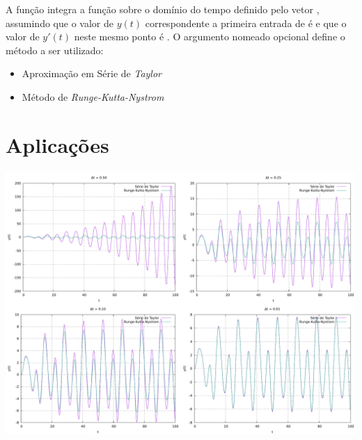 \documentclass{homework}
\begin{document}
	A função  integra a função  sobre o domínio do tempo definido pelo vetor , assumindo que o valor de $y(t)$ correspondente a primeira entrada de  é  e que o valor de $y'(t)$ neste mesmo ponto é . O argumento nomeado opcional  define o método a ser utilizado:
	\begin{itemize}[leftmargin=100pt]
		\item[\code{'taylor'}] Aproximação em Série de \textit{Taylor}
		\item[\code{'runge-kutta-nystrom'}] Método de \textit{Runge-Kutta-Nystrom}
	\end{itemize}
	
	
	
	\newpage
	
	\section*{Aplicações}
	
	\questx[{Resolva a seguinte equação diferencial pelos métodos 'Expansão em Série de \textit{Taylor}' e \textit{Runge-Kutta-Nystrom}, $0 \le t \le 100$, utilizando o programa desenvolvido na Tarefa 02:%
	\begin{align*}%
		&m y''(t) + c y'(t) + k y(t) = F(t)\\
		&m = 1; c = 0.2; k = 1;\\
		&F(t) = 2 \sin (w t) + \sin (2 w t) + cos (3 w t)\\
		&w = 0.5;\\
		&y'(0) = y(0) = 0.0
	\end{align*}%
	}]

	\begin{fig}
		\includegraphics[width=\textwidth]{../src/plot/L6-Q2.pdf}
	\end{fig}
\end{document}
